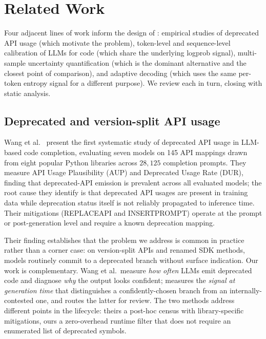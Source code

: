 \section{Related Work}
\label{sec:related}

Four adjacent lines of work inform the design of \eps: empirical studies of
deprecated API usage (which motivate the problem), token-level and
sequence-level calibration of LLMs for code (which share the underlying
logprob signal), multi-sample uncertainty quantification (which is the
dominant alternative and the closest point of comparison), and adaptive
decoding (which uses the same per-token entropy signal for a different
purpose). We review each in turn, closing with static analysis.

\subsection{Deprecated and version-split API usage}
\label{subsec:related-deprecated}

Wang et al.~\cite{wang2025deprecated} present the first systematic study of
deprecated API usage in LLM-based code completion, evaluating seven models
on 145 API mappings drawn from eight popular Python libraries across
$28{,}125$ completion prompts. They measure API Usage Plausibility (AUP)
and Deprecated Usage Rate (DUR), finding that deprecated-API emission is
prevalent across all evaluated models; the root cause they identify is
that deprecated API usages are present in training data while deprecation
status itself is not reliably propagated to inference time. Their
mitigations (REPLACEAPI and INSERTPROMPT) operate at the prompt or
post-generation level and require a known deprecation mapping.

Their finding establishes that the problem we address is common in practice
rather than a corner case: on version-split APIs and renamed SDK methods,
models routinely commit to a deprecated branch without surface indication.
Our work is complementary. Wang et al.\ measure \emph{how often} LLMs emit
deprecated code and diagnose \emph{why} the output looks confident; \eps
measures the \emph{signal at generation time} that distinguishes a
confidently-chosen branch from an internally-contested one, and routes the
latter for review. The two methods address different points in the
lifecycle: theirs a post-hoc census with library-specific mitigations,
ours a zero-overhead runtime filter that does not require an enumerated
list of deprecated symbols.


